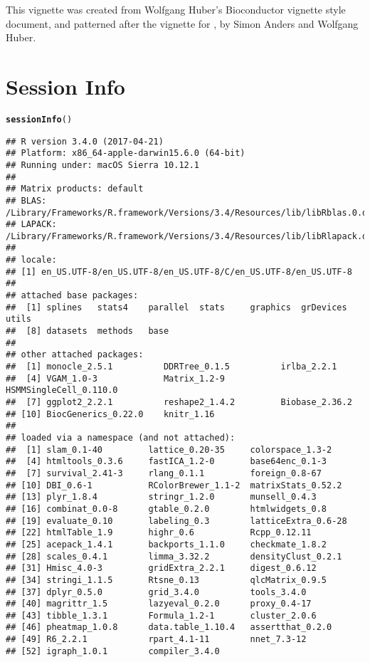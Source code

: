 \documentclass[10pt,oneside]{article}\usepackage[]{graphicx}\usepackage[]{color}
\makeatletter
\newcommand{\hlstd}[1]{\textcolor[rgb]{0.345,0.345,0.345}{#1}}%
\newcommand{\hlkwd}[1]{\textcolor[rgb]{0.737,0.353,0.396}{\textbf{#1}}}%
\newenvironment{kframe}{%
 \def\at@end@of@kframe{}%
 \ifinner\ifhmode%
  \def\at@end@of@kframe{\end{minipage}}%
  \begin{minipage}{\columnwidth}%
 \fi\fi%
 \def\FrameCommand##1{\hskip\@totalleftmargin \hskip-\fboxsep
 \colorbox{shadecolor}{##1}\hskip-\fboxsep
     \hskip-\linewidth \hskip-\@totalleftmargin \hskip\columnwidth}%
 \MakeFramed {\advance\hsize-\width
   \@totalleftmargin\z@ \linewidth\hsize
   \@setminipage}}%
 {\par\unskip\endMakeFramed%
 \at@end@of@kframe}
\newenvironment{knitrout}{}{} %
\makeatother
\begin{document}
 This vignette was created from Wolfgang Huber's Bioconductor vignette style document, and patterned after the vignette for , by Simon Anders and Wolfgang Huber.

\section{Session Info}
\begin{knitrout}
\color{fgcolor}\begin{kframe}
\begin{alltt}
\hlkwd{sessionInfo}\hlstd{()}
\end{alltt}
\begin{verbatim}
## R version 3.4.0 (2017-04-21)
## Platform: x86_64-apple-darwin15.6.0 (64-bit)
## Running under: macOS Sierra 10.12.1
## 
## Matrix products: default
## BLAS: /Library/Frameworks/R.framework/Versions/3.4/Resources/lib/libRblas.0.dylib
## LAPACK: /Library/Frameworks/R.framework/Versions/3.4/Resources/lib/libRlapack.dylib
## 
## locale:
## [1] en_US.UTF-8/en_US.UTF-8/en_US.UTF-8/C/en_US.UTF-8/en_US.UTF-8
## 
## attached base packages:
##  [1] splines   stats4    parallel  stats     graphics  grDevices utils    
##  [8] datasets  methods   base     
## 
## other attached packages:
##  [1] monocle_2.5.1          DDRTree_0.1.5          irlba_2.2.1           
##  [4] VGAM_1.0-3             Matrix_1.2-9           HSMMSingleCell_0.110.0
##  [7] ggplot2_2.2.1          reshape2_1.4.2         Biobase_2.36.2        
## [10] BiocGenerics_0.22.0    knitr_1.16            
## 
## loaded via a namespace (and not attached):
##  [1] slam_0.1-40         lattice_0.20-35     colorspace_1.3-2   
##  [4] htmltools_0.3.6     fastICA_1.2-0       base64enc_0.1-3    
##  [7] survival_2.41-3     rlang_0.1.1         foreign_0.8-67     
## [10] DBI_0.6-1           RColorBrewer_1.1-2  matrixStats_0.52.2 
## [13] plyr_1.8.4          stringr_1.2.0       munsell_0.4.3      
## [16] combinat_0.0-8      gtable_0.2.0        htmlwidgets_0.8    
## [19] evaluate_0.10       labeling_0.3        latticeExtra_0.6-28
## [22] htmlTable_1.9       highr_0.6           Rcpp_0.12.11       
## [25] acepack_1.4.1       backports_1.1.0     checkmate_1.8.2    
## [28] scales_0.4.1        limma_3.32.2        densityClust_0.2.1 
## [31] Hmisc_4.0-3         gridExtra_2.2.1     digest_0.6.12      
## [34] stringi_1.1.5       Rtsne_0.13          qlcMatrix_0.9.5    
## [37] dplyr_0.5.0         grid_3.4.0          tools_3.4.0        
## [40] magrittr_1.5        lazyeval_0.2.0      proxy_0.4-17       
## [43] tibble_1.3.1        Formula_1.2-1       cluster_2.0.6      
## [46] pheatmap_1.0.8      data.table_1.10.4   assertthat_0.2.0   
## [49] R6_2.2.1            rpart_4.1-11        nnet_7.3-12        
## [52] igraph_1.0.1        compiler_3.4.0
\end{verbatim}
\end{kframe}
\end{knitrout}



\end{document}
